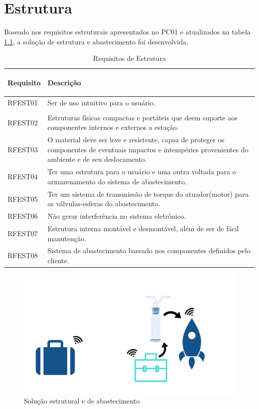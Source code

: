 \chapter{Estrutura}

\par Baseado nos requisitos estruturais apresentados no PC01 e atualizados na tabela \ref{tab:Requisitos de Estrutura}, a solução de estrutura e abastecimento foi desenvolvida.

\begin{table}[H]
\centering
\begin{tabular}{ | m{2cm} | m{12cm}| } 
 \hline
 \textbf{Requisito} & \begin{center}\textbf{Descrição}
   
 \end{center} \\ 
 \hline
 RFEST01 & Ser de uso intuitivo para o usuário.\\
 & \\
\hline
 RFEST02 & Estruturas físicas compactas e portáteis que deem suporte aos componentes internos e externos a estação. \\
 \hline
 RFEST03 & O material deve ser leve e resistente, capaz de proteger os componentes de eventuais impactos e intempéries provenientes do ambiente e de seu deslocamento. \\
  \hline
RFEST04 & Ter uma estrutura para o usuário e uma outra voltada para o armazenamento do sistema de abastecimento. \\
\hline
RFEST05 & Ter um sistema de transmissão de torque do atuador(motor) para as válvulas-esferas do abastecimento. \\
\hline
RFEST06 & Não gerar interferência no sistema eletrônico.  \\
\hline
RFEST07 & Estrutura interna montável e desmontável, além de ser de fácil manutenção. \\
\hline
RFEST08 & Sistema de abastecimento baseado nos componentes definidos pelo cliente. \\
\hline
\end{tabular}
\caption{Requisitos de Estrutura}
\label{tab:Requisitos de Estrutura}
\end{table}

\begin{figure}[!h]
	\centering
	\label{bateria_maleta}
		\includegraphics[width=1\textwidth]{figuras/solucao_estrutura.png}
	\caption{Solução estrutural e de abastecimento}
	\label{fig:soluçao_estrut}
	\end{figure}

